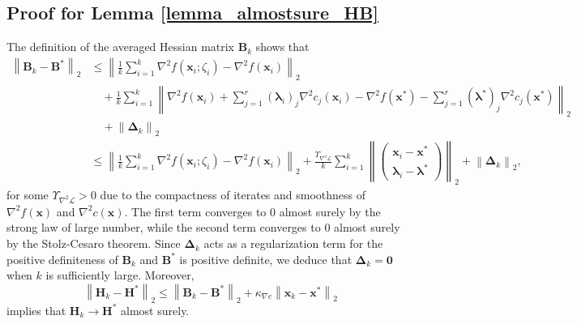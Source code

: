 \documentclass[aos]{imsart}
\numberwithin{equation}{section}
\theoremstyle{plain}
\begin{document}
\begin{appendix}
    \subsection{Proof for Lemma \ref{lemma_almostsure_HB}}
    \label{sec:appendix3.2}
    The definition of the averaged Hessian matrix $\bm{B}_k$ shows that
    \begin{equation}
        \begin{split}
            \left\| \bm{B}_k - \bm{B}^{*} \right\|_2 
            & \leq  \left\| \frac{1}{k} \sum_{i=1}^{k} \nabla^2 f(\bm{x}_i; \zeta_{i}) - \nabla^2 f(\bm{x}_i) \right\|_2 \\
            & \hspace{1em} + \frac{1}{k} \sum_{i=1}^{k} \left\|  \nabla^2 f(\bm{x}_i) + \sum_{j=1}^{r} \left( \bm{\lambda}_{i}\right)_{j}\nabla^2 c_j(\bm{x}_{i}) -  \nabla^2 f(\bm{x}^{*}) - \sum_{j=1}^{r} \left( \bm{\lambda}^{*}\right)_{j}\nabla^2 c_j(\bm{x}^{*}) \right\|_2 \\
            & \hspace{1em} + \left\|\bm{\Delta}_k \right\|_2 \\
            & \leq \left\| \frac{1}{k} \sum_{i=1}^{k} \nabla^2 f(\bm{x}_i; \zeta_{i}) - \nabla^2 f(\bm{x}_i) \right\|_2 + \frac{\Upsilon_{\nabla^2 \mathcal{L}}}{k} \sum_{i=1}^{k} \left\| \left( \begin{array}{c}
                \bm{x}_{i} - \bm{x}^{*} \\
                \bm{\lambda}_{i} - \bm{\lambda}^{*}
            \end{array} \right) \right\|_2 + \left\| \bm{\Delta}_{k} \right\|_2,
        \end{split}
    \end{equation}
    for some $\Upsilon_{\nabla^2 \mathcal{L}}>0$ due to the compactness of iterates and smoothness of $\nabla^2 f (\bm{x})$ and $\nabla^2 c (\bm{x})$.
    The first term converges to $0$ almost surely by the strong law of large number, while the second term converges to $0$ almost surely by the Stolz-Cesaro theorem. Since $\bm{\Delta}_{k}$ acts as a regularization term for the positive definiteness of $\bm{B}_k$ and $\bm{B}^{*}$ is positive definite, we deduce that $\bm{\Delta}_{k} = \bm{0}$ when $k$ is sufficiently large. Moreover, 
    \begin{equation*}
        \left\| \bm{H}_k - \bm{H}^{*} \right\|_2 \leq \left\| \bm{B}_k - \bm{B}^{*} \right\|_2 + \kappa_{\nabla c} \left\| \bm{x}_{k} - \bm{x}^{*} \right\|_2
    \end{equation*}
    implies that  $\bm{H}_k \to \bm{H}^{*} $ almost surely.
   


\end{appendix}
\end{document}
